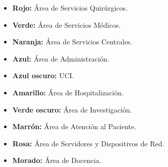 \begin{itemize}
    \item \textbf{Rojo:} Área de Servicios Quirúrgicos.
    \item \textbf{Verde:} Área de Servicios Médicos.
    \item \textbf{Naranja:} Área de Servicios Centrales.
    \item \textbf{Azul:} Área de Administración.
    \item \textbf{Azul oscuro:} UCI.
    \item \textbf{Amarillo:} Área de Hospitalización.
    \item \textbf{Verde oscuro:} Área de Investigación.
    \item \textbf{Marrón:} Área de Atención al Paciente.
    \item \textbf{Rosa:} Área de Servidores y Dispositivos de Red.
    \item \textbf{Morado:} Área de Docencia.
\end{itemize}
